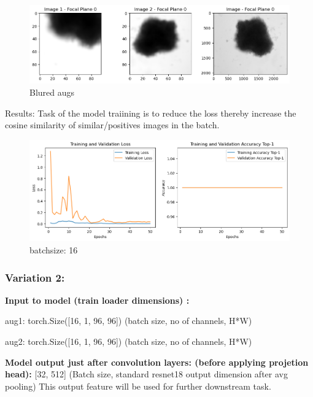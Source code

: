 \documentclass[12pt,twoside,a4paper,parskip]{scrbook} %
\begin{document}
  \begin{figure}[H]
    \centering
    \includegraphics[width=0.9\linewidth]{figures/op4.png} %
    \caption{Blured augs}
    \label{fig:output4}
  \end{figure}

Results:
Task of the model traiining is to reduce the loss thereby increase the cosine similarity of similar/positives images in the batch.
\begin{figure}[H]
  \centering
  \includegraphics[width=0.9\linewidth]{figures/image.png} %
  \caption{batchsize: 16}
  \label{fig:batch 16}
\end{figure}
\subsubsection{Variation 2:}
\textbf{Input to model (train loader dimensions) :} 

  aug1: torch.Size([16, 1, 96, 96])        (batch size, no of channels, H*W)

  aug2: torch.Size([16, 1, 96, 96])        (batch size, no of channels, H*W)

  \textbf{Model output just after convolution layers: (before applying projetion head):} [32, 512]  (Batch size, standard resnet18 output dimension after avg pooling)   This output feature will be used for further downstream task.
\end{document}

